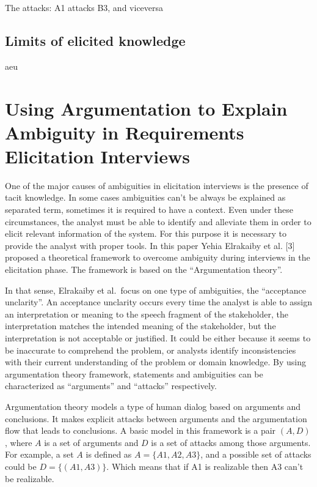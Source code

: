 \documentclass[]{llncs}
\begin{document}
The attacks: A1 attacks B3, and viceversa

\hypertarget{limits-of-elicited-knowledge}{%
\subsection{Limits of elicited
knowledge}\label{limits-of-elicited-knowledge}}

aeu

\hypertarget{using-argumentation-to-explain-ambiguity-in-requirements-elicitation-interviews}{%
\section{Using Argumentation to Explain Ambiguity in Requirements
Elicitation
Interviews}\label{using-argumentation-to-explain-ambiguity-in-requirements-elicitation-interviews}}

One of the major causes of ambiguities in elicitation interviews is the
presence of tacit knowledge. In some cases ambiguities can't be always
be explained as separated term, sometimes it is required to have a
context. Even under these circumstances, the analyst must be able to
identify and alleviate them in order to elicit relevant information of
the system. For this purpose it is necessary to provide the analyst with
proper tools. In this paper Yehia Elrakaiby et al. {[}3{]} proposed a
theoretical framework to overcome ambiguity during interviews in the
elicitation phase. The framework is based on the ``Argumentation
theory''.

In that sense, Elrakaiby et al.~focus on one type of ambiguities, the
``acceptance unclarity''. An acceptance unclarity occurs every time the
analyst is able to assign an interpretation or meaning to the speech
fragment of the stakeholder, the interpretation matches the intended
meaning of the stakeholder, but the interpretation is not acceptable or
justified. It could be either because it seems to be inaccurate to
comprehend the problem, or analysts identify inconsistencies with their
current understanding of the problem or domain knowledge. By using
argumentation theory framework, statements and ambiguities can be
characterized as ``arguments'' and ``attacks'' respectively.

Argumentation theory models a type of human dialog based on arguments
and conclusions. It makes explicit attacks between arguments and the
argumentation flow that leads to conclusions. A basic model in this
framework is a pair \((A,D)\), where \(A\) is a set of arguments and
\(D\) is a set of attacks among those arguments. For example, a set
\(A\) is defined as \(A = \{A1,A2,A3\}\), and a possible set of attacks
could be \(D = \{(A1,A3)\}\). Which means that if A1 is realizable then
A3 can't be realizable.
\end{document}
